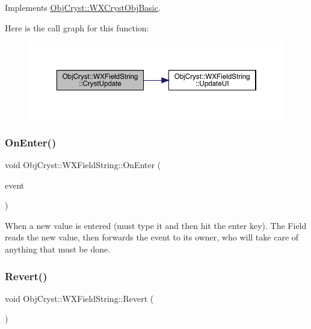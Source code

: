Implements \mbox{\hyperlink{class_obj_cryst_1_1_w_x_cryst_obj_basic_a7ac00ae2ae28f1a6fa26e6fa571186b6}{Obj\+Cryst\+::\+W\+X\+Cryst\+Obj\+Basic}}.

Here is the call graph for this function\+:
\nopagebreak
\begin{figure}[H]
\begin{center}
\leavevmode
\includegraphics[width=350pt]{class_obj_cryst_1_1_w_x_field_string_acac0d32e4560531e1cab6af0071bb55f_cgraph}
\end{center}
\end{figure}
\mbox{\label{class_obj_cryst_1_1_w_x_field_string_a4ab041e7f333884f0bfb8371699a47ad}} 
\subsubsection{\texorpdfstring{OnEnter()}{OnEnter()}}
{\footnotesize\ttfamily void Obj\+Cryst\+::\+W\+X\+Field\+String\+::\+On\+Enter (\begin{DoxyParamCaption}\item[{wx\+Command\+Event \&}]{event }\end{DoxyParamCaption})}

When a new value is entered (must type it and then hit the \textquotesingle{}enter\textquotesingle{} key). The Field reads the new value, then forwards the event to its owner, who will take care of anything that must be done. \mbox{\label{class_obj_cryst_1_1_w_x_field_string_a0372d3d98cad5236fc2ebb628c881600}} 
\subsubsection{\texorpdfstring{Revert()}{Revert()}}
{\footnotesize\ttfamily void Obj\+Cryst\+::\+W\+X\+Field\+String\+::\+Revert (\begin{DoxyParamCaption}{ }\end{DoxyParamCaption})\hspace{0.3cm}{\ttfamily [virtual]}}

